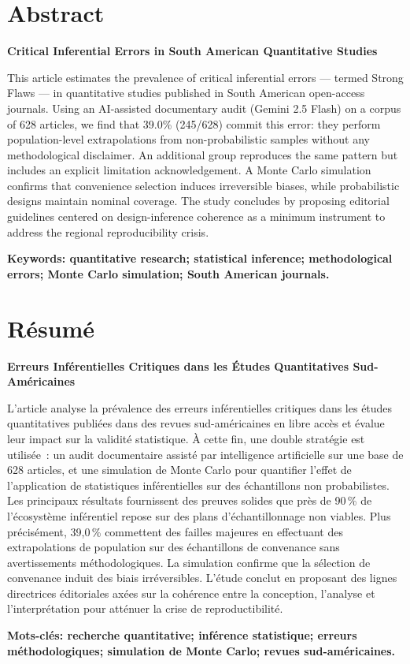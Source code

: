 \documentclass[11pt,twoside]{article}
\newcommand{\TituloEN}{Critical Inferential Errors in South American Quantitative Studies}
\newcommand{\TituloFR}{Erreurs Inférentielles Critiques dans les Études Quantitatives Sud-Américaines}
\newcommand{\AbsBlock}[4]{%
  \section*{#1}%
  {\bfseries\large #2\par}%
  #3\par
  \vspace{4pt}%
  {\bfseries #4}%
  \vspace{8pt}%
}
\begin{document}
\AbsBlock{Abstract}{\TituloEN}{%
This article estimates the prevalence of critical inferential errors — termed Strong Flaws — in quantitative studies published in South American open-access journals. Using an AI-assisted documentary audit (Gemini 2.5 Flash) on a corpus of 628 articles, we find that 39.0\% (245/628) commit this error: they perform population-level extrapolations from non-probabilistic samples without any methodological disclaimer. An additional group reproduces the same pattern but includes an explicit limitation acknowledgement. A Monte Carlo simulation confirms that convenience selection induces irreversible biases, while probabilistic designs maintain nominal coverage. The study concludes by proposing editorial guidelines centered on design-inference coherence as a minimum instrument to address the regional reproducibility crisis.%
}{\textbf{Keywords:} quantitative research; statistical inference; methodological errors; Monte Carlo simulation; South American journals.}

\AbsBlock{Résumé}{\TituloFR}{%
L'article analyse la prévalence des erreurs inférentielles critiques dans les études quantitatives publiées dans des revues sud-américaines en libre accès et évalue leur impact sur la validité statistique. \`A cette fin, une double stratégie est utilisée~: un audit documentaire assisté par intelligence artificielle sur une base de 628 articles, et une simulation de Monte Carlo pour quantifier l'effet de l'application de statistiques inférentielles sur des échantillons non probabilistes. Les principaux résultats fournissent des preuves solides que pr\`es de 90\,\% de l'écosyst\`eme inférentiel repose sur des plans d'échantillonnage non viables. Plus précisément, 39,0\,\% commettent des failles majeures en effectuant des extrapolations de population sur des échantillons de convenance sans avertissements méthodologiques. La simulation confirme que la sélection de convenance induit des biais irréversibles. L'étude conclut en proposant des lignes directrices éditoriales axées sur la cohérence entre la conception, l'analyse et l'interprétation pour atténuer la crise de reproductibilité.%
}{\textbf{Mots-clés:} recherche quantitative; inférence statistique; erreurs méthodologiques; simulation de Monte Carlo; revues sud-américaines.}
\end{document}
